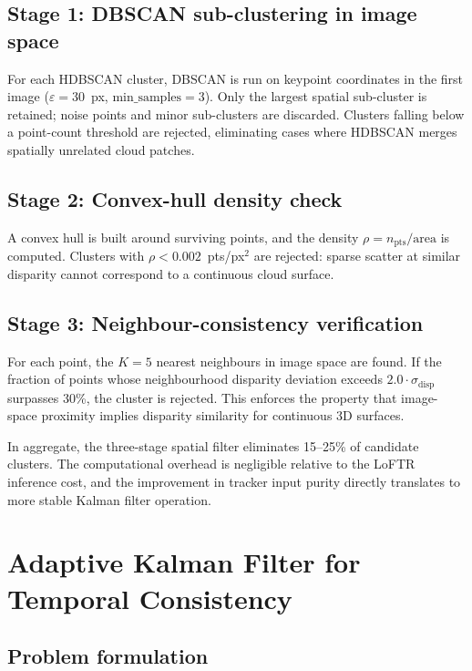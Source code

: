 \documentclass[preprint,
superscriptaddress,
amsmath,amssymb,aps,
twoside,final,secnumarabic,
nofootinbib]{revtex4-2}
\begin{document}
\subsection{Stage 1: DBSCAN sub-clustering in image space}

For each HDBSCAN cluster, DBSCAN is run on keypoint coordinates in the first image ($\varepsilon = 30$~px, $\text{min\_samples} = 3$). Only the largest spatial sub-cluster is retained; noise points and minor sub-clusters are discarded. Clusters falling below a point-count threshold are rejected, eliminating cases where HDBSCAN merges spatially unrelated cloud patches.

\subsection{Stage 2: Convex-hull density check}

A convex hull is built around surviving points, and the density $\rho = n_\text{pts} / \text{area}$ is computed. Clusters with $\rho < 0.002$~pts/px$^2$ are rejected: sparse scatter at similar disparity cannot correspond to a continuous cloud surface.

\subsection{Stage 3: Neighbour-consistency verification}

For each point, the $K = 5$ nearest neighbours in image space are found. If the fraction of points whose neighbourhood disparity deviation exceeds $2.0 \cdot \sigma_\text{disp}$ surpasses 30\%, the cluster is rejected. This enforces the property that image-space proximity implies disparity similarity for continuous 3D surfaces.

In aggregate, the three-stage spatial filter eliminates 15--25\% of candidate clusters. The computational overhead is negligible relative to the LoFTR inference cost, and the improvement in tracker input purity directly translates to more stable Kalman filter operation.

\section{Adaptive Kalman Filter for Temporal Consistency}\label{sec:kalman}

\subsection{Problem formulation}
\end{document}
